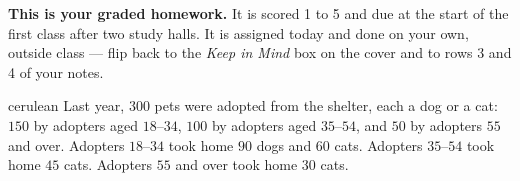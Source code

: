 \documentclass[12pt]{article}
\begin{document}

\vspace{0.08in}

\begin{remindbox}
\small
\textbf{This is your graded homework.} It is scored 1 to 5 and due at the start of the first
class after two study halls. It is assigned today and done on your own, outside class --- flip
back to the \emph{Keep in Mind} box on the cover and to rows 3 and 4 of your notes.
\end{remindbox}

\vspace{0.05in}

\boxguard[12]
\begin{scenariobox}{cerulean}
\small
Last year, $300$ pets were adopted from the shelter, each a dog or a cat: $150$ by adopters aged
$18$--$34$, $100$ by adopters aged $35$--$54$, and $50$ by adopters $55$ and over. Adopters
$18$--$34$ took home $90$ dogs and $60$ cats. Adopters $35$--$54$ took home $45$ cats. Adopters
$55$ and over took home $30$ cats.
\end{scenariobox}

\vspace{0.05in}
\end{document}

